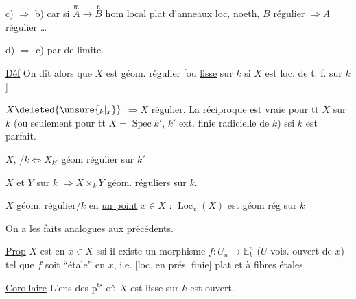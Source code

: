 c) $\Rightarrow$ b) car si $\overset{\mathfrak m}{A}\to\overset{\mathfrak n}{B}$ hom local plat d'anneaux loc, noeth,  $B$ régulier $\Rightarrow A$ régulier \ldots

d) $\Rightarrow$ c) par  de limite.

\uline{Déf} On dit alors que $X$ est géom. régulier [ou \uline{lisse} sur $k$ si $X$ est loc. de t. f. sur $k$]

$X\deleted{\unsure{{}_k|{}_x}}$  $\Longrightarrow X$ régulier. La réciproque est vraie pour tt $X$ sur $k$ (ou seulement pour tt $X=\operatorname{Spec}k'$, $k'$ ext. finie radicielle de $k$) ssi $k$ est parfait.

$X$,  $/k\Longleftrightarrow X_{k'}$ géom régulier sur $k'$

$X$ et $Y$  sur $k$ $\Longrightarrow X\times_kY$ géom. réguliers sur $k$.

$X$  géom. régulier/$k$ en \uline{un point} $x\in X$ : $\operatorname{Loc}_x(X)$ est géom rég sur $k$ 

On a les faits analogues aux précédents.


\uline{Prop} $X$  est  en $x\in X$ ssi il existe un  morphisme $f:U_u\longrightarrow\mathbb E^n_k$ ($U$ vois. ouvert de $x$) tel que $f$ soit ``étale'' en $x$, i.e. [loc. en prés. finie] plat et à fibres étales

\uline{Corollaire} L'ens des p$^{\mathrm{ts}}$ où $X$ est  lisse sur $k$ est ouvert.

